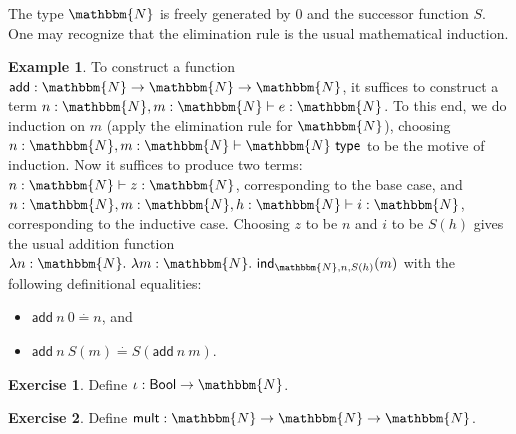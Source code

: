 \documentclass{amsart}
\theoremstyle{definition}
\newtheorem{eg}{Example}[section]
\newtheorem{ex}{Exercise}[section]
\newcommand{\N}{\mathbbm{N}}
\newcommand{\type}{\ensuremath{\mathsf{~type}}}
\newcommand{\defeq}{\ensuremath{\overset{\boldsymbol{\cdot}}{=}}}
\newcommand{\Bool}{\ensuremath{\mathsf{Bool}}}
\newcommand{\Ind}{\ensuremath{\mathsf{ind}}}
\begin{document}
The type $\N$ is freely generated by $0$ and the successor function $S$.
One may recognize that the elimination rule is the usual mathematical induction.

\begin{eg}\label{eg:add}
    To construct a function $\mathsf{add} : \N \to \N \to \N$, it suffices to construct a term $n : \N, m : \N \vdash e : \N$.
    To this end, we do induction on $m$ (apply the elimination rule for $\N$), choosing $n : \N, m : \N \vdash \N \type$ to be the motive of induction.
    Now it suffices to produce two terms: $n : \N \vdash z : \N$, corresponding to the base case, and $n : \N, m : \N, h : \N \vdash i : \N$, corresponding to the inductive case.
    Choosing $z$ to be $n$ and $i$ to be $S(h)$ gives the usual addition function $\lambda n : \N.~\lambda m : \N.~\Ind_{\N,n,S(h)}(m)$ with the following definitional equalities:
    \begin{itemize}
        \item $\mathsf{add}~n~0 \defeq n$, and
        \item $\mathsf{add}~n~S(m) \defeq S(\mathsf{add}~n~m)$.
    \end{itemize}
\end{eg}

\begin{ex}\label{ex:iota}
    Define $\iota : \Bool \to \N$.
\end{ex}

\begin{ex}\label{ex:mult}
    Define $\mathsf{mult} :  \N \to \N \to \N$.
\end{ex}
\end{document}

